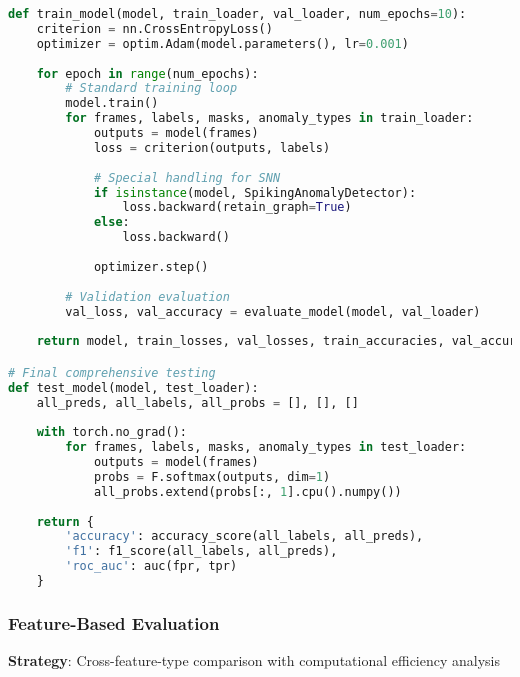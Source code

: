 \documentclass[11pt,a4paper]{article}
\begin{document}
\begin{lstlisting}[language=Python, caption=Architecture-Based Evaluation]
def train_model(model, train_loader, val_loader, num_epochs=10):
    criterion = nn.CrossEntropyLoss()
    optimizer = optim.Adam(model.parameters(), lr=0.001)
    
    for epoch in range(num_epochs):
        # Standard training loop
        model.train()
        for frames, labels, masks, anomaly_types in train_loader:
            outputs = model(frames)
            loss = criterion(outputs, labels)
            
            # Special handling for SNN
            if isinstance(model, SpikingAnomalyDetector):
                loss.backward(retain_graph=True)
            else:
                loss.backward()
            
            optimizer.step()
        
        # Validation evaluation
        val_loss, val_accuracy = evaluate_model(model, val_loader)
    
    return model, train_losses, val_losses, train_accuracies, val_accuracies

# Final comprehensive testing
def test_model(model, test_loader):
    all_preds, all_labels, all_probs = [], [], []
    
    with torch.no_grad():
        for frames, labels, masks, anomaly_types in test_loader:
            outputs = model(frames)
            probs = F.softmax(outputs, dim=1)
            all_probs.extend(probs[:, 1].cpu().numpy())
    
    return {
        'accuracy': accuracy_score(all_labels, all_preds),
        'f1': f1_score(all_labels, all_preds),
        'roc_auc': auc(fpr, tpr)
    }
\end{lstlisting}

\subsubsection{Feature-Based Evaluation}
\textbf{Strategy}: Cross-feature-type comparison with computational efficiency analysis
\end{document}
